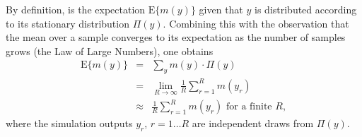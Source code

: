 By definition,  is the expectation $\text{E}\{m(y)\}$
given that $y$ is distributed according to its stationary distribution
$\Pi(y)$. Combining this with the observation that the mean over
a sample converges to its expectation as the number of samples grows
(the Law of Large Numbers), one obtains
\begin{eqnarray}
\text{E}\{m(y)\} & = & \sum_{y}m(y)\cdot\Pi(y)\label{eq:define-question}\\
 & = & \lim_{R\rightarrow\infty}\frac{1}{R}\sum_{r=1}^{R}m(y_{r})\\
 & \approx & \frac{1}{R}\sum_{r=1}^{R}m(y_{r})\,\,\text{for a finite }R,\label{eq:approximate-answer}
\end{eqnarray}
where the simulation outputs $y_{r}$, $r=1\ldots R$ are independent
draws from $\Pi(y)$.

